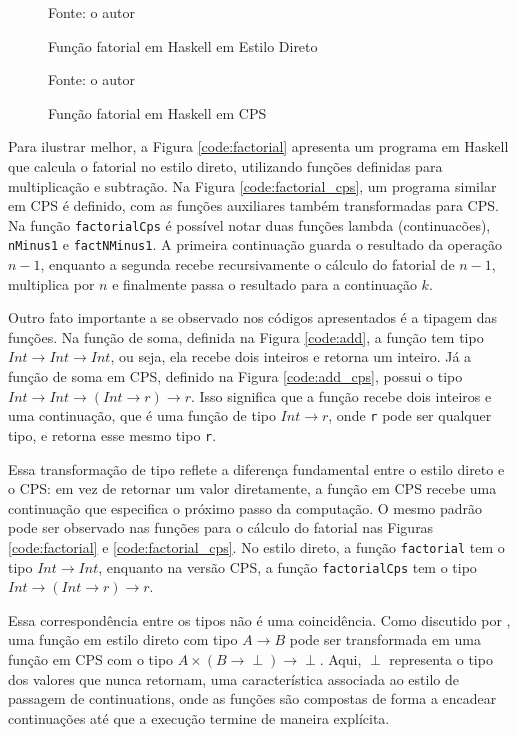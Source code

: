 \begin{figure}
  \caption{Função fatorial em Haskell em Estilo Direto}
  \small{Fonte: o autor}
  
\end{figure}

\begin{figure}
  \caption{Função fatorial em Haskell em CPS}
  \small{Fonte: o autor}
  
\end{figure}

Para ilustrar melhor, a Figura \ref{code:factorial} apresenta um programa em Haskell que calcula o fatorial no estilo direto, utilizando funções definidas para multiplicação e subtração.
Na Figura \ref{code:factorial_cps}, um programa similar em CPS é definido, com as funções auxiliares também transformadas para CPS.
Na função \texttt{factorialCps} é possível notar duas funções lambda (continuacões), \texttt{nMinus1} e \texttt{factNMinus1}.
A primeira continuação guarda o resultado da operação $n - 1$, enquanto a segunda recebe recursivamente o cálculo do fatorial de $n - 1$, multiplica por $n$ e finalmente passa o resultado para a continuação $k$.

Outro fato importante a se observado nos códigos apresentados é a tipagem das funções.
Na função de soma, definida na Figura \ref{code:add}, a função tem tipo $Int \rightarrow Int \rightarrow Int$, ou seja, ela recebe dois inteiros e retorna um inteiro.
Já a função de soma em CPS, definido na Figura \ref{code:add_cps}, possui o tipo $Int \rightarrow Int \rightarrow (Int \rightarrow r) \rightarrow r$. Isso significa que a função recebe dois inteiros e uma continuação, que é uma função de tipo $Int \rightarrow r$, onde \texttt{r} pode ser qualquer tipo, e retorna esse mesmo tipo \texttt{r}.

Essa transformação de tipo reflete a diferença fundamental entre o estilo direto e o CPS: em vez de retornar um valor diretamente, a função em CPS recebe uma continuação que especifica o próximo passo da computação.
O mesmo padrão pode ser observado nas funções para o cálculo do fatorial nas Figuras \ref{code:factorial} e \ref{code:factorial_cps}.
No estilo direto, a função \texttt{factorial} tem o tipo $Int \rightarrow Int$, enquanto na versão CPS, a função \texttt{factorialCps} tem o tipo $Int \rightarrow (Int \rightarrow r) \rightarrow r$.

Essa correspondência entre os tipos não é uma coincidência.
Como discutido por \cite{TORRENS2019}, uma função em estilo direto com tipo $A \rightarrow B$ pode ser transformada em uma função em CPS com o tipo $A \times (B \rightarrow \perp) \rightarrow \perp$.
Aqui, $\perp$ representa o tipo dos valores que nunca retornam, uma característica associada ao estilo de passagem de continuations, onde as funções são compostas de forma a encadear continuações até que a execução termine de maneira explícita.
